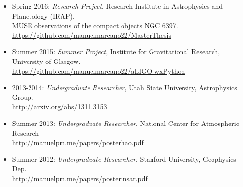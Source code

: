 \documentclass[letterpaper,10pt]{article}
\begin{document}



\begin{itemize}[label=$\blacktriangleright$]
        \item Spring 2016: \emph{Research Project}, Research Institute in Astrophysics and Planetology (IRAP).\\
                MUSE observations of the compact objects NGC 6397. \url{https://github.com/manuelmarcano22/MasterThesis} 
                
\end{itemize}
                



\begin{itemize}[label=$\blacktriangleright$]
\item Summer 2015: \emph{Summer Project}, Institute for Gravitational Research, University of Glasgow.\\
\url{https://github.com/manuelmarcano22/aLIGO-wxPython}
\end{itemize}



\begin{itemize}[label=$\blacktriangleright$]
  \item 2013-2014: \emph{Undergraduate Researcher}, Utah State University, Astrophysics Group.  \\
  \url{http://arxiv.org/abs/1311.3153}
  \end{itemize}

\begin{itemize}[label=$\blacktriangleright$]
  \item Summer 2013: \emph{Undergraduate Researcher}, National Center for Atmospheric Research \\
\url{http://manuelpm.me/papers/posterhao.pdf}
  \end{itemize}

\begin{itemize}[label=$\blacktriangleright$]
  \item Summer 2012: \emph{Undergraduate Researcher}, Stanford University, Geophysics Dep.\ \\
\url{http://manuelpm.me/papers/posterinsar.pdf} 
  \end{itemize}
\end{document}
